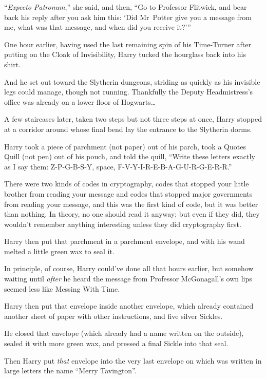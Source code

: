 “\emph{Expecto Patronum},” she said, and then, “Go to Professor Flitwick, and bear back his reply after you ask him this: ‘Did Mr~Potter give you a message from me, what was that message, and when did you receive it?’”

\later

One hour earlier, having used the last remaining spin of his Time-Turner after putting on the Cloak of Invisibility, Harry tucked the hourglass back into his shirt.

And he set out toward the Slytherin dungeons, striding as quickly as his invisible legs could manage, though not running. Thankfully the Deputy Headmistress’s office was already on a lower floor of Hogwarts…

A few staircases later, taken two steps but not three steps at once, Harry stopped at a corridor around whose final bend lay the entrance to the Slytherin dorms.

Harry took a piece of parchment (not paper) out of his parch, took a Quotes Quill (not pen) out of his pouch, and told the quill, “Write these letters exactly as I say them: Z-P-G-B-S-Y, space, F-V-Y-I-R-E-B-A-G-U-R-G-E-R-R.”

There were two kinds of codes in cryptography, codes that stopped your little brother from reading your message and codes that stopped major governments from reading your message, and this was the first kind of code, but it was better than nothing. In theory, no one should read it anyway; but even if they did, they wouldn’t remember anything interesting unless they did cryptography first.

Harry then put that parchment in a parchment envelope, and with his wand melted a little green wax to seal it.

In principle, of course, Harry could’ve done all that hours earlier, but somehow waiting until \emph{after} he heard the message from Professor McGonagall’s own lips seemed less like Messing With Time.

Harry then put that envelope inside another envelope, which already contained another sheet of paper with other instructions, and five silver Sickles.

He closed that envelope (which already had a name written on the outside), sealed it with more green wax, and pressed a final Sickle into that seal.

Then Harry put \emph{that} envelope into the very last envelope on which was written in large letters the name “Merry Tavington”.

